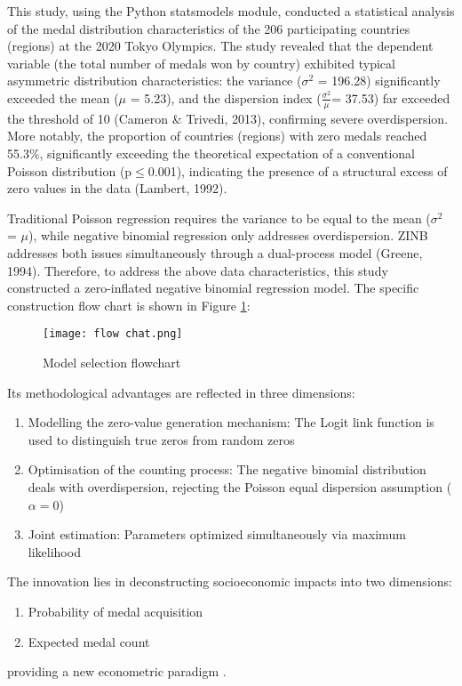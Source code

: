 \documentclass[11pt,twoside]{article}
\numberwithin{Theorem}{section}
\numberwithin{Definition}{section}
\numberwithin{Lemma}{section}
\numberwithin{Algorithm}{section}
\numberwithin{equation}{section}
\begin{document}
This study, using the Python statsmodels module, conducted a statistical analysis of the medal distribution characteristics of the 206 participating countries (regions) at the 2020 Tokyo Olympics. The study revealed that the dependent variable (the total number of medals won by country) exhibited typical asymmetric distribution characteristics: the variance ($\sigma^2$ = 196.28) significantly exceeded the mean ($\mu$ = 5.23), and the dispersion index ($\frac{\sigma^2}{\mu}$= 37.53) far exceeded the threshold of 10 (Cameron \& Trivedi, 2013), confirming severe overdispersion. 
More notably, the proportion of countries (regions) with zero medals reached 55.3\%, significantly exceeding the theoretical expectation of a conventional Poisson distribution (p$\leq$0.001), indicating the presence of a structural excess of zero values in the data (Lambert, 1992).

Traditional Poisson regression requires the variance to be equal to the mean ($\sigma^2$ = $\mu$), while negative binomial regression only addresses overdispersion. ZINB addresses both issues simultaneously through a dual-process model (Greene, 1994). Therefore, to address the above data characteristics, this study constructed a zero-inflated negative binomial regression model. The specific construction flow chart is shown in Figure \ref{fig:model_selection}:

\begin{figure}[!ht]
\centering
\texttt{[image: flow chat.png]}
\caption{Model selection flowchart}
\label{fig:model_selection}
\end{figure}

Its methodological advantages are reflected in three dimensions: 
\begin{enumerate}
    \item Modelling the zero-value generation mechanism: The Logit link function \cite{lambert1992} is used to distinguish true zeros from random zeros
    \item Optimisation of the counting process: The negative binomial distribution \cite{greene1994} deals with overdispersion, rejecting the Poisson equal dispersion assumption ($\alpha = 0$)
    \item Joint estimation: Parameters optimized simultaneously via maximum likelihood \cite{seabold2010}
\end{enumerate}

The innovation lies in deconstructing socioeconomic impacts into two dimensions:
\begin{enumerate}
    \item Probability of medal acquisition
    \item Expected medal count
\end{enumerate}
providing a new econometric paradigm \cite{aeberhard2012}.
\end{document}
